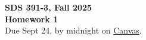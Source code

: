 \documentclass[12pt]{article}
\begin{document}
\begin{center}
{\bf SDS 391-3, Fall 2025 \\
 Homework 1}\\
 \vspace{5pt}
 Due Sept 24, by midnight on \href{https://canvas.utexas.edu/index.html}{Canvas}.
\end{center}

%
%



\begin{enumerate}




\end{enumerate}
\end{document}
